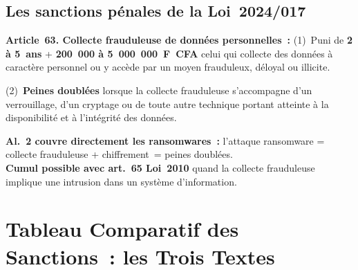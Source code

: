 \subsection{Les sanctions pénales de la Loi~2024/017}

\begin{boxjuris}
\textbf{Article~63. Collecte frauduleuse de données personnelles~:}
(1)~Puni de \textbf{2 à 5~ans} + \textbf{200~000 à 5~000~000~F~CFA}
celui qui collecte des données à caractère personnel ou y accède par
un moyen frauduleux, déloyal ou illicite.

(2)~\textbf{Peines doublées} lorsque la collecte frauduleuse s'accompagne
d'un verrouillage, d'un cryptage ou de toute autre technique portant atteinte
à la disponibilité et à l'intégrité des données.

\textbf{Al.~2 couvre directement les ransomwares~:} l'attaque ransomware
= collecte frauduleuse + chiffrement~= peines doublées.\\[0.3ex]
\textbf{Cumul possible avec art.~65 Loi~2010} quand la collecte frauduleuse
implique une intrusion dans un système d'information.
\end{boxjuris}

\section{Tableau Comparatif des Sanctions~: les Trois Textes}
\label{sec:sanctions-comparees}

